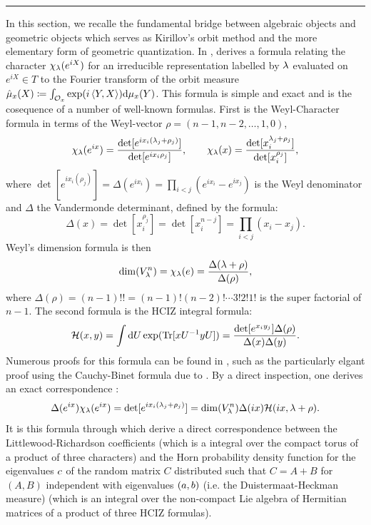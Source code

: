 \documentclass[notitlepage, 10pt]{article}
\begin{document}
\hrule
    In this section, we recalle the fundamental bridge between algebraic objects and geometric objects which serves as Kirillov's orbit method and the more elementary form of geometric quantization.
    In \cite{coquereaux2019revisiting}, \citeauthor{coquereaux2019revisiting} derives a formula relating the character $\chi_\lambda(e^{iX})$ for an irreducible representation labelled by $\lambda$ evaluated on $e^{iX} \in T$ to the Fourier transform of the orbit measure $\hat \mu_{x}(X) \coloneqq \int_{\mathcal O_{x}} \exp(i \braket{Y, X}) \mathrm{d} \mu_{x}(Y)$.
    This formula is simple and exact and is the cosequence of a number of well-known formulas.
    First is the Weyl-Character formula in terms of the Weyl-vector $\rho = (n-1, n-2, \ldots, 1, 0)$,
    \begin{equation}
        \chi_{\lambda}(e^{ix}) = \frac{\det[e^{ix_i(\lambda_j+\rho_j)}]}{\det[e^{ix_i\rho_j}]},
        \qquad
        \chi_{\lambda}(x) = \frac{\det[x_i^{\lambda_j+\rho_j}]}{\det[x_i^{\rho_j}]},
    \end{equation}
    where $\det[e^{ix_i(\rho_j)}] = \Delta(e^{ix_i}) = \prod_{i<j} (e^{ix_i}-e^{ix_j})$ is the Weyl denominator and $\Delta$ the Vandermonde determinant, defined by the formula:
    \begin{equation}
        \Delta(x) = \det[x_i^{\rho_j}] = \det[x_i^{n-j}] = \prod_{i<j}(x_i-x_j).
    \end{equation}
    Weyl's dimension formula is then 
    \begin{equation}
        \dim(V_{\lambda}^n) = \chi_{\lambda}(e) = \frac{\Delta(\lambda+\rho)}{\Delta(\rho)},
    \end{equation}
    where $\Delta(\rho) = (n-1)!! = (n-1)!(n-2)!\cdots 3!2!1!$ is the super factorial of $n-1$.
    The second formula is the HCIZ integral formula:
    \begin{equation}
        \mathcal H(x,y) = \int \mathrm{d} U \exp(\operatorname{Tr}[xU^{-1}yU]) = \frac{\det[e^{x_iy_j}]\Delta(\rho)}{\Delta(x)\Delta(y)}.
    \end{equation}
    Numerous proofs for this formula can be found in \cite{mcswiggen2021harish}, such as the particularly elgant proof using the Cauchy-Binet formula due to \cite{balantekin2000character}.
    By a direct inspection, one derives an exact correspondence \cite[Equation 18]{coquereaux2018orbital}:
    \begin{equation}
        \Delta(e^{ix})\chi_{\lambda}(e^{ix}) = \det[e^{ix_i(\lambda_j+\rho_j)}] = \dim(V_{\lambda}^{n})\Delta(ix) \mathcal H(ix,\lambda+\rho).
    \end{equation}
    It is this formula through which \citeauthor{coquereaux2020horn} derive a direct correspondence between the Littlewood-Richardson coefficients (which is a integral over the compact torus of a product of three characters) and the Horn probability density function for the eigenvalues $c$ of the random matrix $C$ distributed such that $C=A+B$ for $(A,B)$ independent with eigenvalues $(a,b)$ (i.e. the Duistermaat-Heckman measure) (which is an integral over the non-compact Lie algebra of Hermitian matrices of a product of three HCIZ formulas).
\end{document}
